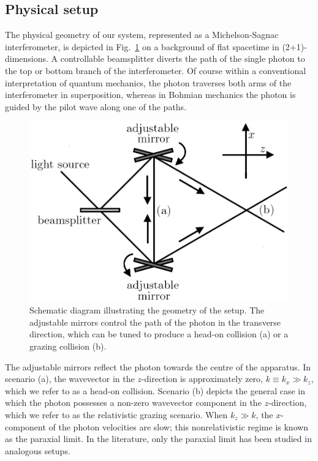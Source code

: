 \documentclass[12pt,prx,
,nofootinbib
,floatfix
,superscriptaddress
]{revtex4-2}
\begin{document}
\subsection{Physical setup}
The physical geometry of our system, represented as a Michelson-Sagnac interferometer, is depicted in Fig.\ \ref{fig:setup} on a background of flat spacetime in (2+1)-dimensions. A controllable beamsplitter diverts the path of the single photon to the top or bottom branch of the interferometer. Of course within a conventional interpretation of quantum mechanics, the photon traverses both arms of the interferometer in superposition, whereas in Bohmian mechanics the photon is guided by the pilot wave along one of the paths. 
\begin{figure}[t]
    \centering
    \includegraphics[width=.5\linewidth]{Fig1schematic.png}
    \caption{Schematic diagram illustrating the geometry of the setup. The adjustable mirrors control the path of the photon in the transverse direction, which can be tuned to produce a head-on collision (a) or a grazing collision (b).}
    \label{fig:setup}
\end{figure}
The adjustable mirrors reflect the photon towards the centre of the apparatus. In scenario (a), the wavevector in the $z$-direction is approximately zero, $k \equiv k_x \gg k_z$, which we refer to as a head-on collision. Scenario (b) depicts the general case in which the photon possesses a non-zero wavevector component in the $z$-direction, which we refer to as the relativistic grazing scenario. When $k_z \gg k$, the $x$-component of the photon velocities are slow; this nonrelativistic regime is known as the paraxial limit. In the literature, only the paraxial limit has been studied in analogous setups.
\end{document}
